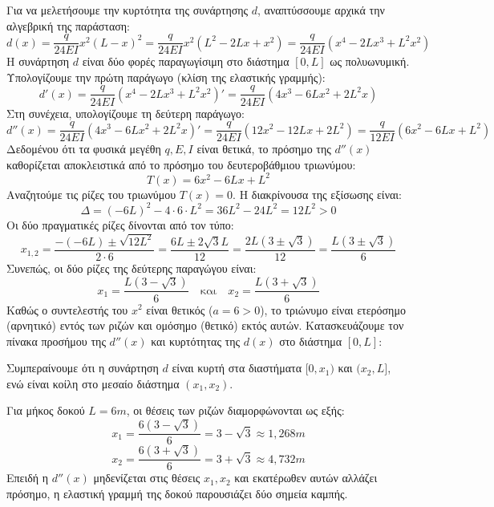 \begin{alist}
\item Για να μελετήσουμε την κυρτότητα της συνάρτησης $d$, αναπτύσσουμε αρχικά την αλγεβρική της παράσταση:
\[d(x)=\frac{q}{24EI}x^2(L-x)^2 = \frac{q}{24EI}x^2(L^2-2Lx+x^2) = \frac{q}{24EI}\left(x^4-2Lx^3+L^2x^2\right)\]
Η συνάρτηση $d$ είναι δύο φορές παραγωγίσιμη στο διάστημα $[0,L]$ ως πολυωνυμική. 
Υπολογίζουμε την πρώτη παράγωγο (κλίση της ελαστικής γραμμής):
\[d'(x)=\frac{q}{24EI}\left(x^4-2Lx^3+L^2x^2\right)' = \frac{q}{24EI}\left(4x^3-6Lx^2+2L^2x\right)\]
Στη συνέχεια, υπολογίζουμε τη δεύτερη παράγωγο:
\[d''(x)=\frac{q}{24EI}\left(4x^3-6Lx^2+2L^2x\right)' = \frac{q}{24EI}\left(12x^2-12Lx+2L^2\right) = \frac{q}{12EI}\left(6x^2-6Lx+L^2\right)\]
Δεδομένου ότι τα φυσικά μεγέθη $q, E, I$ είναι θετικά, το πρόσημο της $d''(x)$ καθορίζεται αποκλειστικά από το πρόσημο του δευτεροβάθμιου τριωνύμου:
\[T(x) = 6x^2-6Lx+L^2\]
Αναζητούμε τις ρίζες του τριωνύμου $T(x)=0$. Η διακρίνουσα της εξίσωσης είναι:
\[\Delta = (-6L)^2 - 4 \cdot 6 \cdot L^2 = 36L^2 - 24L^2 = 12L^2 > 0\]
Οι δύο πραγματικές ρίζες δίνονται από τον τύπο:
\[x_{1,2} = \frac{-(-6L) \pm \sqrt{12L^2}}{2 \cdot 6} = \frac{6L \pm 2\sqrt{3}L}{12} = \frac{2L(3 \pm \sqrt{3})}{12} = \frac{L(3 \pm \sqrt{3})}{6}\]
Συνεπώς, οι δύο ρίζες της δεύτερης παραγώγου είναι:
\[x_1 = \frac{L(3-\sqrt{3})}{6} \quad \text{και} \quad x_2 = \frac{L(3+\sqrt{3})}{6}\]
Καθώς ο συντελεστής του $x^2$ είναι θετικός ($a=6>0$), το τριώνυμο είναι ετερόσημο (αρνητικό) εντός των ριζών και ομόσημο (θετικό) εκτός αυτών. Κατασκευάζουμε τον πίνακα προσήμου της $d''(x)$ και κυρτότητας της $d(x)$ στο διάστημα $[0,L]$:

\begin{center}
\end{center}

Συμπεραίνουμε ότι η συνάρτηση $d$ είναι κυρτή στα διαστήματα $[0,x_1)$ και $(x_2,L]$, ενώ είναι κοίλη στο μεσαίο διάστημα $(x_1,x_2)$.

\item Για μήκος δοκού $L=6\si{m}$, οι θέσεις των ριζών διαμορφώνονται ως εξής:
\[x_1 = \frac{6(3-\sqrt{3})}{6} = 3-\sqrt{3} \approx 1{,}268\si{m}\]
\[x_2 = \frac{6(3+\sqrt{3})}{6} = 3+\sqrt{3} \approx 4{,}732\si{m}\]
Επειδή η $d''(x)$ μηδενίζεται στις θέσεις $x_1, x_2$ και εκατέρωθεν αυτών αλλάζει πρόσημο, η ελαστική γραμμή της δοκού παρουσιάζει δύο σημεία καμπής.


\end{alist}
